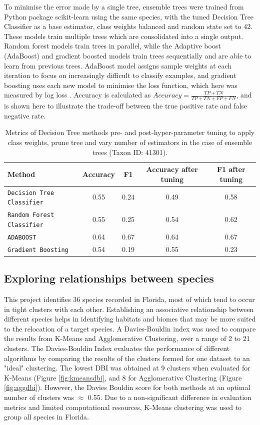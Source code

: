 \documentclass{article}
\begin{document}
To minimise the error made by a single tree, ensemble trees were trained from Python package scikit-learn \cite{scikit-learn}using the same species, with the tuned Decision Tree Classifier as a base estimator, class weights balanced and random state set to 42. These models train multiple trees which are consolidated into a single output. Random forest models train trees in parallel, while the Adaptive boost (AdaBoost) and gradient boosted models train trees sequentially and are able to learn from previous trees\cite{ensembles}. AdaBoost model assigns sample weights at each iteration to focus on increasingly difficult to classify examples, and gradient boosting uses each new model to minimise the loss function, which here was measured by log loss \cite{rahman}. Accuracy is calculated as $Accuracy = \frac{TP+TN}{TP+TN+FP+FN}$, and is shown here to illustrate the trade-off between the true positive rate and false negative rate.
\begin{table}[ht]
\centering
\begin{tabular}{lcccc}
\toprule
\textbf{Method} & \textbf{Accuracy} & \textbf{F1}  & \textbf{Accuracy after tuning} & \textbf{F1 after tuning}     \\
\midrule
\texttt{Decision Tree Classifier}       & 0.55& 0.24&0.49&0.58 \\ 
\texttt{Random Forest Classifier}     & 0.55 & 0.25 & 0.54 & 0.62 \\ 
\texttt{ADABOOST}  & 0.64& 0.67 & 0.64&0.67 \\ 
\texttt{Gradient Boosting} & 0.54& 0.19&0.55&0.23\\
\bottomrule
\end{tabular}
\caption{Metrics of Decision Tree methods pre- and post-hyper-parameter tuning to apply class weights, prune tree and vary number of estimators in the case of ensemble trees (Taxon ID: 41301).}
\label{tab:ensemble_results}
\end{table}

\subsection{Exploring relationships between species}
This project identifies 36 species recorded in Florida, most of which tend to occur in tight clusters with each other. Establishing an associative relationship between different species helps in identifying habitats and biomes that may be more suited to the relocation of a target species\cite{iucnguide}. 
A Davies-Bouldin index was used to compare the results from K-Means and Agglomerative Clustering, over a range of 2 to 21 clusters. The Davies-Bouldin Index evaluates the performance of different algorithms by comparing the results of the clusters formed for one dataset to an "ideal" clustering\cite{DaviesBouldinIndex}. The lowest DBI was obtained at 9 clusters when evaluated for K-Means (Figure \ref{fig:kmeansdbi}, and 8 for Agglomerative Clustering (Figure \ref{fig:aggdbi}). However, the Davies Bouldin score for both methods at an optimal number of clusters was $\approx$ 0.55. Due to a non-significant difference in evaluation metrics and limited computational resources, K-Means clustering was used to group all species in Florida. 
\end{document}
